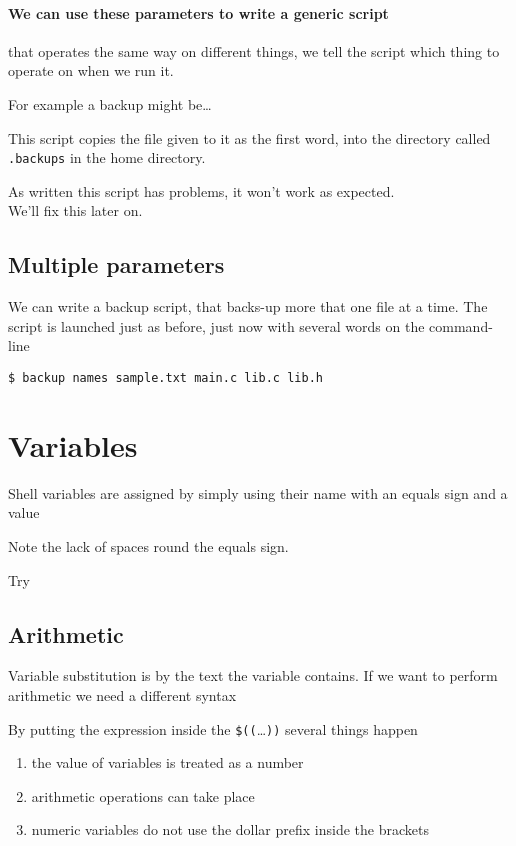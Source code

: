 \documentclass[12pt,a4paper]{article}
\begin{document}
\paragraph{We can use these parameters to write a generic script} that
operates the same way on different things, we tell the script which thing to
operate on when we run it.

For example a backup might be\ldots
\begin{code}[title=backup]

\end{code}
This script copies the file given to it as the first word, into the directory
called \texttt{.backups} in the home directory.
\begin{note}{\small\faWarning}
As written this script has problems, it won't work as expected.  \\
We'll fix this later on.
\end{note}

\subsection{Multiple parameters}
We can write a backup script, that backs-up more that one file at a time.
The script is launched just as before, just now with several words on the
command-line
\begin{terminal}
\begin{verbatim}
$ backup names sample.txt main.c lib.c lib.h
\end{verbatim}
\end{terminal}

\section{Variables}
Shell variables are assigned by simply using their name with an equals
sign and a value
\begin{terminal}

\end{terminal}
Note the lack of spaces round the equals sign.

Try
\begin{terminal}

\end{terminal}

\subsection{Arithmetic}
Variable substitution is by the text the variable contains.  If we
want to perform arithmetic we need a different syntax
\begin{terminal}
 
\end{terminal}
By putting the expression inside the \texttt{\$((}\ldots\texttt{))}
several things happen
\begin{enumerate}
\item the value of variables is treated as a number
\item arithmetic operations can take place
\item numeric variables do not use the dollar prefix inside the brackets
\end{enumerate}
\end{document}
